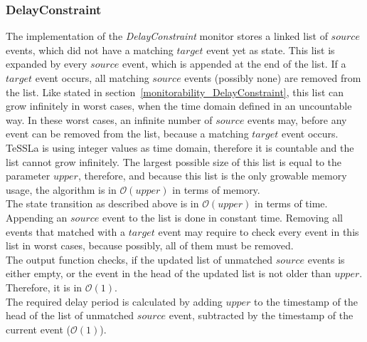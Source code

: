 	 
\subsubsection{DelayConstraint}
	The implementation of the \emph{DelayConstraint} monitor stores a linked list of $source$ events, which did not have a matching $target$ event yet as state. This list is expanded by every $source$ event, which is appended at the end of the list. If a $target$ event occurs, all matching $source$ events (possibly none) are removed from the list. Like stated in section~\ref{monitorability_DelayConstraint}, this list can grow infinitely in worst cases, when the time domain defined in an uncountable way. In these worst cases, an infinite number of $source$ events may, before any event can be removed from the list, because a matching $target$ event occurs.\\
	TeSSLa is using integer values as time domain, therefore it is countable and the list cannot grow infinitely. The largest possible size of this list is equal to the parameter $upper$, therefore, and because this list is the only growable memory usage, the algorithm is in $\mathcal{O}(upper)$ in terms of memory.\\
	The state transition as described above is in  $\mathcal{O}(upper)$ in terms of time. Appending an $source$ event to the list is done in constant time. Removing all events that matched with a $target$ event may require to check every event in this list in worst cases, because possibly, all of them must be removed.\\
	The output function checks, if the updated list of unmatched $source$ events is either empty, or the event in the head of the updated list is not older than $upper$. Therefore, it is in $\mathcal{O}(1)$.\\
	The required delay period is calculated by adding $upper$ to the timestamp of the head of the list of unmatched $source$ event, subtracted by the timestamp of the current event ($\mathcal{O}(1)$).\\
	
